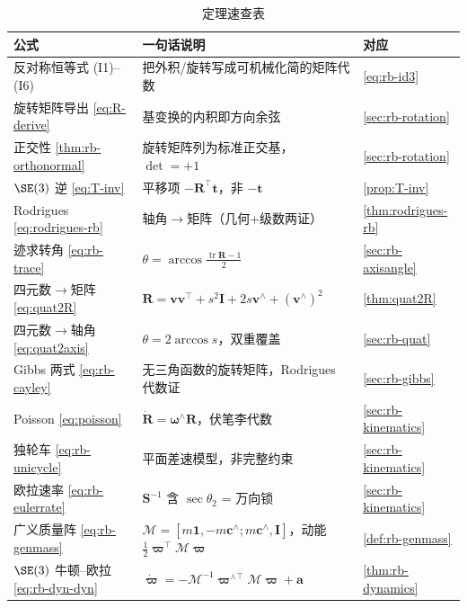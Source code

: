 \begin{table}[H]\centering\small
\caption{定理速查表}
\begin{tabular}{lll}
\toprule
公式 & 一句话说明 & 对应 \\
\midrule
反对称恒等式 (I1)--(I6) & 把外积/旋转写成可机械化简的矩阵代数 & \cref{eq:rb-id3} \\
旋转矩阵导出 \cref{eq:R-derive} & 基变换的内积即方向余弦 & \cref{sec:rb-rotation} \\
正交性 \cref{thm:rb-orthonormal} & 旋转矩阵列为标准正交基，$\det=+1$ & \cref{sec:rb-rotation}\\
$\SE(3)$ 逆 \cref{eq:T-inv} & 平移项 $-\mathbf{R}^\top\mathbf{t}$，非 $-\mathbf{t}$ & \cref{prop:T-inv} \\
Rodrigues \cref{eq:rodrigues-rb} & 轴角$\to$矩阵（几何+级数两证） & \cref{thm:rodrigues-rb} \\
迹求转角 \cref{eq:rb-trace} & $\theta=\arccos\frac{\operatorname{tr}\mathbf{R}-1}{2}$ & \cref{sec:rb-axisangle} \\
四元数$\to$矩阵 \cref{eq:quat2R} & $\mathbf{R}=\mathbf{v}\mathbf{v}^\top+s^2\mathbf{I}+2s\mathbf{v}^\wedge+(\mathbf{v}^\wedge)^2$ & \cref{thm:quat2R} \\
四元数$\to$轴角 \cref{eq:quat2axis} & $\theta=2\arccos s$，双重覆盖 & \cref{sec:rb-quat} \\
Gibbs 两式 \cref{eq:rb-cayley} & 无三角函数的旋转矩阵，Rodrigues 代数证 & \cref{sec:rb-gibbs} \\
Poisson \cref{eq:poisson} & $\dot{\mathbf{R}}=\boldsymbol{\omega}^\wedge\mathbf{R}$，伏笔李代数 & \cref{sec:rb-kinematics} \\
独轮车 \cref{eq:rb-unicycle} & 平面差速模型，非完整约束 & \cref{sec:rb-kinematics} \\
欧拉速率 \cref{eq:rb-eulerrate} & $\mathbf{S}^{-1}$ 含 $\sec\theta_2$ = 万向锁 & \cref{sec:rb-kinematics} \\
广义质量阵 \cref{eq:rb-genmass} & $\boldsymbol{\mathcal{M}}=[m\mathbf{1},-m\mathbf{c}^\wedge;m\mathbf{c}^\wedge,\mathbf{I}]$，动能 $\tfrac12\boldsymbol{\varpi}^\top\boldsymbol{\mathcal{M}}\boldsymbol{\varpi}$ & \cref{def:rb-genmass} \\
$\SE(3)$ 牛顿--欧拉 \cref{eq:rb-dyn-dyn} & $\dot{\boldsymbol{\varpi}}=-\boldsymbol{\mathcal{M}}^{-1}\boldsymbol{\varpi}^{\curlywedge\top}\boldsymbol{\mathcal{M}}\boldsymbol{\varpi}+\mathbf{a}$ & \cref{thm:rb-dynamics} \\
\bottomrule
\end{tabular}
\end{table}

